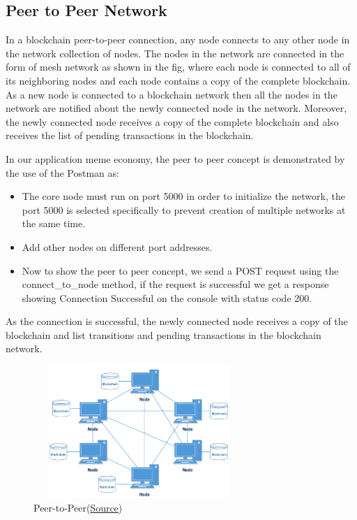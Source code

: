 \documentclass[12pt]{article}
\begin{document}
\subsection{Peer to Peer Network} %
In a blockchain peer-to-peer connection, any node connects to any other node in the network collection of nodes. The nodes in the network are connected in the form of mesh network as shown in the fig, where each node is connected to all of its neighboring nodes and each node contains a copy of the complete blockchain. As a new node is connected to a blockchain network then all the nodes in the network are notified about the newly connected node in the network. Moreover, the newly connected node receives a copy of the complete blockchain and also receives the list of pending transactions in the blockchain. \par
\begin{flushleft}

In our application meme economy, the peer to peer concept is demonstrated by the use of the Postman as:
\begin{itemize}
    \item The core node must run on port 5000 in order to initialize the network, the port 5000 is selected specifically to prevent creation of multiple networks at the same time.
    \item Add other nodes on different port addresses.
    \item Now to show the peer to peer concept, we send a POST request using the connect\_to\_node method, if the request is successful we get a response showing Connection Successful on the console with status code 200.
\end{itemize}
\end{flushleft}
As the connection is successful, the newly connected node receives a copy of the blockchain and list transitions and pending transactions in the blockchain network.
\begin{figure}
    \centering
    \includegraphics[width=8cm, height=5cm]{../report_MemeEcon/images/p2p.png}
    \caption{Peer-to-Peer(\href{https://www.researchgate.net/publication/320127088_Blockchain_Implementation_Quality_Challenges_A_Literature_Review/figures?lo=1&utm_source=google&utm_medium=organic}{Source})}
    \label{fig:P2P}
\end{figure}
\end{document}
